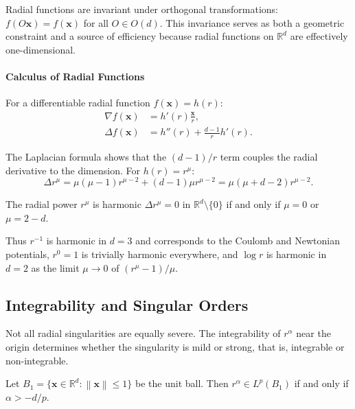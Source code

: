 \documentclass[twoside,11pt]{article}
\newcommand{\R}{\mathbb{R}}
\newcommand{\bx}{\bm{x}}
\newcommand{\norm}[1]{\left\|#1\right\|}
\begin{document}
Radial functions are invariant under orthogonal transformations: $f(O\bx) = f(\bx)$ for all $O \in O(d)$. This invariance serves as both a geometric constraint and a source of efficiency because radial functions on $\R^d$ are effectively one-dimensional.

\paragraph{Calculus of Radial Functions} For a differentiable radial function $f(\bx) = h(r)$:
\begin{align}
	\nabla f(\bx) & = h'(r) \frac{\bx}{r}, \label{eq:radial_gradient}           \\
	\Delta f(\bx) & = h''(r) + \frac{d-1}{r} h'(r). \label{eq:radial_laplacian}
\end{align}

The Laplacian formula shows that the $(d-1)/r$ term couples the radial derivative to the dimension. For $h(r) = r^\mu$:
\begin{equation}
	\Delta r^\mu = \mu(\mu - 1) r^{\mu - 2} + (d-1) \mu r^{\mu - 2} = \mu(\mu + d - 2) r^{\mu - 2}.
	\label{eq:laplacian_power}
\end{equation}

\begin{corollary}
	The radial power $r^\mu$ is harmonic $\Delta r^\mu = 0$ in $\R^d \setminus \{0\}$ if and only if $\mu = 0$ or $\mu = 2 - d$.
\end{corollary}

Thus $r^{-1}$ is harmonic in $d = 3$ and corresponds to the Coulomb and Newtonian potentials, $r^0 = 1$ is trivially harmonic everywhere, and $\log r$ is harmonic in $d = 2$ as the limit $\mu \to 0$ of $(r^\mu - 1)/\mu$.

\subsection{Integrability and Singular Orders}
\label{subsec:integrability}

Not all radial singularities are equally severe. The integrability of $r^\alpha$ near the origin determines whether the singularity is mild or strong, that is, integrable or non-integrable.

\begin{proposition}
	\label{prop:integrability}
	Let $B_1 = \{\bx \in \R^d : \norm{\bx} \leq 1\}$ be the unit ball. Then $r^\alpha \in L^p(B_1)$ if and only if $\alpha > -d/p$.
\end{proposition}
\end{document}
